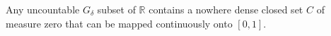 Any uncountable $G_{\delta}$ subset of $\mathbb{R}$ contains a nowhere dense closed set $C$ of measure zero that can be mapped continuously onto $[0, 1]$.

